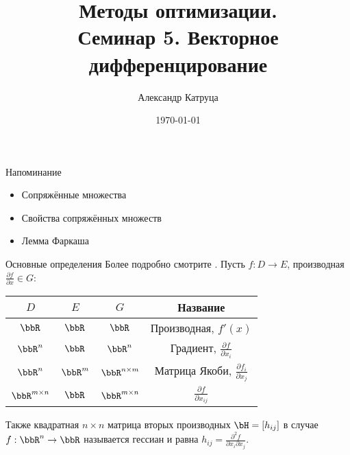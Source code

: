 \documentclass[12pt]{beamer}
\title[Семинар 5]{Методы оптимизации. \\
 Семинар 5. Векторное дифференцирование}
\author{Александр Катруца}
\institute{Московский физико-технический институт\\
Факультет Управления и Прикладной Математики}
\date{\today}
\begin{document}
\begin{frame}
\maketitle
\end{frame}

\begin{frame}{Напоминание}
\begin{itemize}
\item Сопряжённые множества
\item Свойства сопряжённых множеств
\item Лемма Фаркаша
\end{itemize}
\end{frame}

\begin{frame}{Основные определения}
Более подробно смотрите \href{https://en.wikipedia.org/wiki/Matrix_calculus}{}.
Пусть $f: D \rightarrow E$, производная $\frac{\partial f}{\partial x} \in G$:
\begin{table}[!h]
\centering
\begin{tabular}{|c|c|c|c|}
\hline
$D$ & $E$ & $G$ & Название\\
\hline
$\bbR$ & $\bbR$ & $\bbR$ & Производная, $f'(x)$\\
\hline
$\bbR^n$ & $\bbR$ & $\bbR^n$ & Градиент, $\frac{\partial f}{\partial x_i}$\\
\hline
$\bbR^n$ & $\bbR^m$ & $\bbR^{n \times m}$ & Матрица Якоби, $\frac{\partial f_i}{\partial x_j}$ \\
\hline
$\bbR^{m \times n}$ & $\bbR$ & $\bbR^{m \times n}$ & $\frac{\partial f}{\partial x_{ij}}$\\
\hline
\end{tabular}
\end{table}

Также квадратная $n \times n$ матрица вторых производных $\bH = [h_{ij}]$ в случае $f: \bbR^n \rightarrow \bbR$ называется гессиан и равна $h_{ij} = \frac{\partial^2 f}{\partial x_i \partial x_j}$.
\end{frame}
\end{document}
